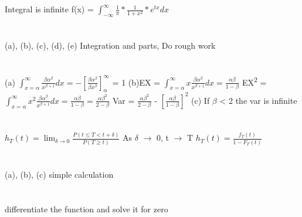 \documentclass{report}
\begin{document}
\section{}
Integral is infinite
f(x) = $\int_{-\infty}^{\infty}\frac{1}{\pi} * \frac{1}{1 + x^2} * e^{tx}dx$
\newline

\section{}
(a), (b), (c), (d), (e) Integration and parts, Do rough work
\newline

\section{}
(a) $\int_{x = \alpha}^{\infty}\frac{\beta\alpha^{\beta}}{x^{\beta + 1}}dx = -\left[\frac{\beta\alpha^{\beta}}{\beta x^{\beta}}\right]^{\infty}_{\alpha}$ = 1
\newline
(b)EX = $\int_{x = \alpha}^{\infty}x\frac{\beta\alpha^{\beta}}{x^{\beta + 1}}dx = \frac{\alpha\beta}{1 - \beta}$
\newline
EX{\textsuperscript{2}} = $\int_{x = \alpha}^{\infty}x^2\frac{\beta\alpha^{\beta}}{x^{\beta + 1}}dx = \frac{\alpha\beta}{1 - \beta} = \frac{\alpha\beta^{2}}{2 - \beta}$
\newline
Var = $\frac{\alpha\beta^{2}}{2 - \beta}$ - $\left[\frac{\alpha\beta}{1 - \beta}\right]^{2}$
\newline
(c) If $\beta$ < 2 the var is infinite
\newline

\section{}
$h_{T}(t) = \lim_{\delta \rightarrow 0}\frac{P(t \le T < t + \delta)}{P(T \ge t)}$
\newline
As $\delta$ $\rightarrow$ 0, t $\rightarrow$ T
\newline
$h_T(t) = \frac{f_T(t)}{1 - F_T(t)}$
\newline

\section{}
(a), (b), (c) simple calculation
\newline

\section{}
differentiate the function and solve it for zero
\end{document}
